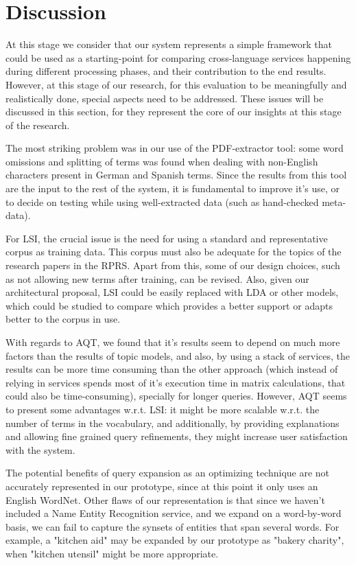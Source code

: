 \documentclass{llncs}
\begin{document}
\section{Discussion}

At this stage we consider that our system represents a simple framework that could be used as a starting-point for comparing cross-language services happening during different processing phases, and their contribution to the end results. However, at this stage of our research, for this evaluation to be meaningfully and realistically done, special aspects need to be addressed. These issues will be discussed in this section, for they represent the core of our insights at this stage of the research.

The most striking problem was in our use of the PDF-extractor tool: some word omissions and splitting of terms was found when dealing with non-English characters present in German and Spanish terms. Since the results from this tool are the input to the rest of the system, it is fundamental to improve it's use, or to decide on testing while using well-extracted data (such as hand-checked meta-data).

For LSI, the crucial issue is the need for using a standard and representative corpus as training data. This corpus must also be adequate for the topics of the research papers in the RPRS.  Apart from this, some of our design choices, such as not allowing new terms after training, can be revised. Also, given our architectural proposal, LSI could be easily replaced with LDA or other models, which could be studied to compare which provides a better support or adapts better to the corpus in use.

With regards to AQT, we found that it's results seem to depend on much more factors than the results of topic models, and also, by using a stack of services, the results can be more time consuming than the other approach (which instead of relying in services spends most of it's execution time in matrix calculations, that could also be time-consuming), specially for longer queries. However, AQT seems to present some advantages w.r.t. LSI: it might be more scalable w.r.t. the number of terms in the vocabulary, and additionally, by providing explanations and allowing fine grained query refinements, they might increase user satisfaction with the system.

The potential benefits of query expansion as an optimizing technique are not accurately represented in our prototype, since at this point it only uses an English WordNet. Other flaws of our representation is that since we haven't included a Name Entity Recognition service, and we expand on a word-by-word basis, we can fail to capture the synsets of entities that span several words. For example, a "kitchen aid" may be expanded by our prototype as "bakery charity", when "kitchen utensil" might be more appropriate.
\end{document}
